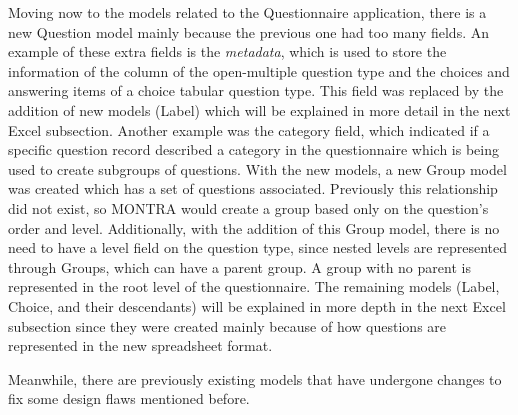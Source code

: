 Moving now to the models related to the Questionnaire application, there is a new Question model mainly because the previous one had too many fields.
An example of these extra fields is the \textit{metadata}, which is used to store the information of the column of the open-multiple question type and the choices and answering items of a choice tabular question type.
This field was replaced by the addition of new models (Label) which will be explained in more detail in the next Excel subsection.
Another example was the category field, which indicated if a specific question record described a category in the questionnaire which is being used to create subgroups of questions.
With the new models, a new Group model was created which has a set of questions associated.
Previously this relationship did not exist, so MONTRA would create a group based only on the question's order and level.
Additionally, with the addition of this Group model, there is no need to have a level field on the question type, since nested levels are represented through Groups, which can have a parent group.
A group with no parent is represented in the root level of the questionnaire.
The remaining models (Label, Choice, and their descendants) will be explained in more depth in the next Excel subsection since they were created mainly because of how questions are represented in the new spreadsheet format.

Meanwhile, there are previously existing models that have undergone changes to fix some design flaws mentioned before.

